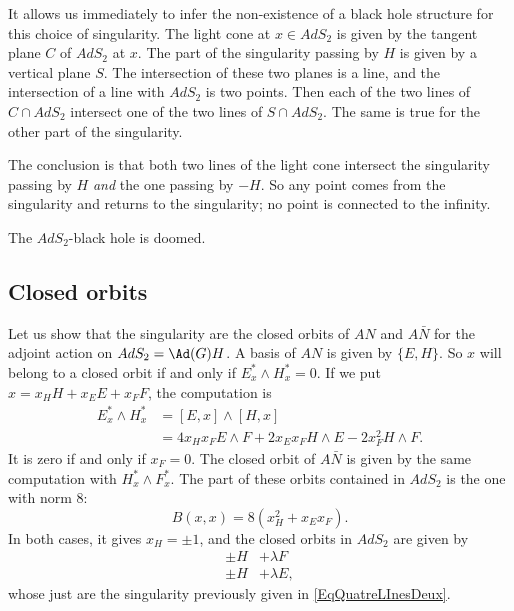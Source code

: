 It allows us immediately to infer the non-existence of a black hole structure for this choice of singularity. The light cone at $x\in AdS_2$ is given by the tangent plane $C$ of $AdS_2$ at $x$. The part of the singularity passing by $H$ is given by a vertical plane $S$. The intersection of these two planes is a line, and the intersection of a line with $AdS_2$ is two points. Then each of the two lines of $C\cap AdS_2$ intersect one of the two lines of $S\cap AdS_2$. The same is true for the other part of the singularity.

The conclusion is that both two lines of the light cone intersect the singularity passing by $H$ \emph{and} the one passing by $-H$.  So any point comes from the singularity and returns to the singularity; no point is connected to the infinity.

The $AdS_2$-black hole is doomed.

\subsection{Closed orbits}

Let us show that the singularity are the closed orbits of $AN$
and $A\bar{N}$ for the adjoint action on $AdS_2=\Ad(G)H$. A basis of $AN$
is given by $\{E,H\}$. So $x$ will belong to a closed orbit if and only if
$E_x^*\wedge H^*_x=0$. If we put $x=x_HH+x_EE+x_FF$, the computation is
\begin{equation}
\begin{split}
E_x^*\wedge H^*_x&=[E,x]\wedge[H,x]\\
                 &=4x_Hx_F E\wedge F+2x_Ex_F H\wedge E-2x_F^2 H\wedge F.
\end{split}
\end{equation}
It is zero if and only if $x_F=0$. The closed orbit of $A\bar{N}$ is given by the same computation with $H^*_x\wedge F^*_x$. The part of these orbits contained in $AdS_2$ is the one with norm $8$:
\begin{equation}
B(x,x)=8(x_H^2+x_Ex_F).
\end{equation}
In both cases, it gives $x_H=\pm 1$, and the closed orbits in $AdS_2$ are given by
\begin{subequations}
\begin{align}
\pm H&+\lambda F\\
\pm H&+\lambda E,
\end{align}
\end{subequations}
whose just are the singularity previously given in \eqref{EqQuatreLInesDeux}.


